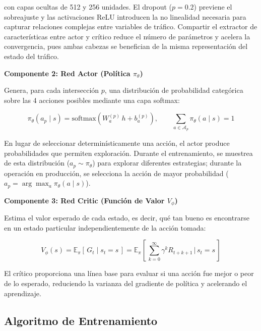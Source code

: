 \documentclass[12pt,a4paper,oneside]{report}
\begin{document}
con capas ocultas de 512 y 256 unidades. El dropout (\(p = 0.2\)) previene el sobreajuste y las activaciones ReLU introducen la no linealidad necesaria para capturar relaciones complejas entre variables de tráfico. Compartir el extractor de características entre actor y crítico reduce el número de parámetros y acelera la convergencia, pues ambas cabezas se benefician de la misma representación del estado del tráfico.

\textbf{Componente 2: Red Actor (Política \(\pi_{\theta}\))}

Genera, para cada intersección \(p\), una distribución de probabilidad categórica sobre las 4 acciones posibles mediante una capa softmax:

\begin{equation}
\pi_{\theta}\!\left(a_{p} \mid s\right) = \mathrm{softmax}\!\left(W_{a}^{(p)}\,h + b_{a}^{(p)}\right), \qquad \sum_{a \in \mathcal{A}_{p}}\pi_{\theta}(a \mid s) = 1
\label{eq:actor}
\end{equation}

En lugar de seleccionar determinísticamente una acción, el actor produce probabilidades que permiten exploración. Durante el entrenamiento, se muestrea de esta distribución (\(a_{p} \sim \pi_{\theta}\)) para explorar diferentes estrategias; durante la operación en producción, se selecciona la acción de mayor probabilidad (\(a_{p} = \arg\max_{a}\pi_{\theta}(a \mid s)\)).

\textbf{Componente 3: Red Critic (Función de Valor \(V_{\phi}\))}

Estima el valor esperado de cada estado, es decir, qué tan bueno es encontrarse en un estado particular independientemente de la acción tomada:

\begin{equation}
V_{\phi}(s) = \mathbb{E}_{\pi}\!\left[\, G_{t} \mid s_{t} = s \,\right] = \mathbb{E}_{\pi}\!\left[\, \sum_{k = 0}^{\infty}\gamma^{k}R_{t + k + 1} \,\Big|\, s_{t} = s \,\right]
\label{eq:critic}
\end{equation}

El crítico proporciona una línea base para evaluar si una acción fue mejor o peor de lo esperado, reduciendo la varianza del gradiente de política y acelerando el aprendizaje.

\subsection{Algoritmo de Entrenamiento}\label{algoritmo-de-entrenamiento}
\end{document}
